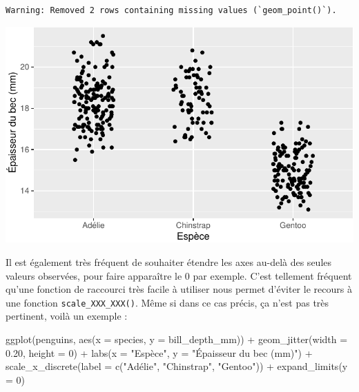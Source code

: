 \documentclass[
  a4paper,
  DIV=11,
  numbers=noendperiod,
  oneside]{scrreprt}
\newenvironment{Shaded}{}{}
\newcommand{\AttributeTok}[1]{\textcolor[rgb]{0.84,0.23,0.29}{#1}}
\newcommand{\DecValTok}[1]{\textcolor[rgb]{0.00,0.36,0.77}{#1}}
\newcommand{\FloatTok}[1]{\textcolor[rgb]{0.00,0.36,0.77}{#1}}
\newcommand{\FunctionTok}[1]{\textcolor[rgb]{0.44,0.26,0.76}{#1}}
\newcommand{\NormalTok}[1]{\textcolor[rgb]{0.14,0.16,0.18}{#1}}
\newcommand{\SpecialCharTok}[1]{\textcolor[rgb]{0.00,0.36,0.77}{#1}}
\newcommand{\StringTok}[1]{\textcolor[rgb]{0.01,0.18,0.38}{#1}}
\begin{document}
\begin{verbatim}
Warning: Removed 2 rows containing missing values (`geom_point()`).
\end{verbatim}

\includegraphics{03-visualization_files/figure-pdf/unnamed-chunk-106-1.pdf}

Il est également très fréquent de souhaiter étendre les axes au-delà des
seules valeurs observées, pour faire apparaître le 0 par exemple. C'est
tellement fréquent qu'une fonction de raccourci très facile à utiliser
nous permet d'éviter le recours à une fonction
\texttt{scale\_XXX\_XXX()}. Même si dans ce cas précis, ça n'est pas
très pertinent, voilà un exemple :

\begin{Shaded}
\begin{Highlighting}[]
\FunctionTok{ggplot}\NormalTok{(penguins, }\FunctionTok{aes}\NormalTok{(}\AttributeTok{x =}\NormalTok{ species, }\AttributeTok{y =}\NormalTok{ bill\_depth\_mm)) }\SpecialCharTok{+}
  \FunctionTok{geom\_jitter}\NormalTok{(}\AttributeTok{width =} \FloatTok{0.20}\NormalTok{, }\AttributeTok{height =} \DecValTok{0}\NormalTok{) }\SpecialCharTok{+}
  \FunctionTok{labs}\NormalTok{(}\AttributeTok{x =} \StringTok{"Espèce"}\NormalTok{, }\AttributeTok{y =} \StringTok{"Épaisseur du bec (mm)"}\NormalTok{) }\SpecialCharTok{+}
  \FunctionTok{scale\_x\_discrete}\NormalTok{(}\AttributeTok{label =} \FunctionTok{c}\NormalTok{(}\StringTok{"Adélie"}\NormalTok{, }\StringTok{"Chinstrap"}\NormalTok{, }\StringTok{"Gentoo"}\NormalTok{)) }\SpecialCharTok{+}
  \FunctionTok{expand\_limits}\NormalTok{(}\AttributeTok{y =} \DecValTok{0}\NormalTok{)}
\end{Highlighting}
\end{Shaded}
\end{document}
